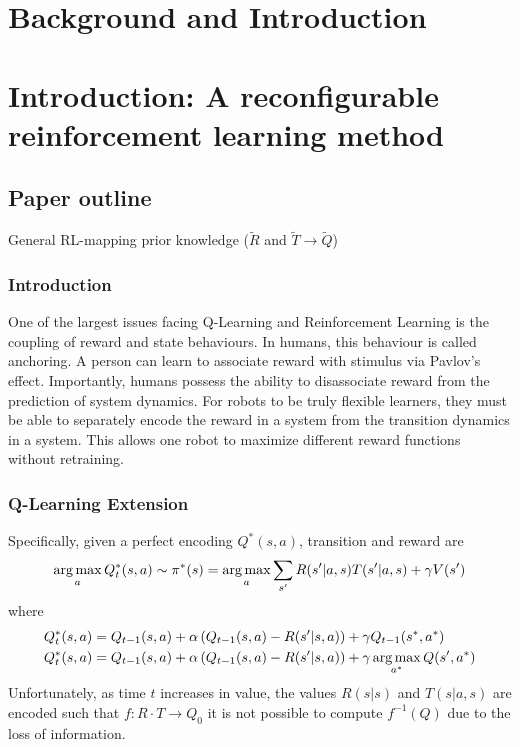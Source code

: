 \section{Background and Introduction}
\label{sec:intro}  

\section*{Introduction: A reconfigurable reinforcement learning method}

\subsection{Paper outline} \circled{$\alpha$} General RL-mapping prior knowledge ($\tilde{R}$ and $\tilde{T}\to\tilde{Q}$)\\

\subsubsection{Introduction} 

One of the largest issues facing Q-Learning and Reinforcement Learning is the coupling of reward and state behaviours. In humans, this behaviour is called anchoring. A person can learn to associate reward with stimulus via Pavlov's effect. Importantly, humans possess the ability to disassociate reward from the prediction of system dynamics. For robots to be truly flexible learners, they must be able to separately encode the reward in a system from the transition dynamics in a system.  This allows one robot to maximize different reward functions without retraining.

\subsubsection{Q-Learning Extension}

Specifically, given a perfect encoding $Q^\ast(s, a)$, transition and reward are 
\begin{equation}
\operatorname*{arg\,max}_{a} Q_t^\ast(s,a)\sim\pi^\ast(s) = \operatorname*{arg\,max}_{a} \sum_{s^\prime} R( s^\prime | a, s ) T( s^\prime | a, s ) + \gamma V( s^\prime )
\end{equation}
where
\begin{align}
Q^\ast_t(s,a) & = Q_{t-1}(s,a)+\alpha \left( Q_{t-1}( s, a ) - R( s^\prime | s, a ) \right) + \gamma Q_{t-1} ( s^\ast, a^\ast ) \\
Q^\ast_t(s,a) & = Q_{t-1}(s,a)+\alpha \left( Q_{t-1}( s, a ) - R( s^\prime | s, a ) \right) + \gamma \operatorname*{arg\,max}_{a^\ast} Q ( s^\prime, a^\ast )
\end{align}
Unfortunately, as time $t$ increases in value, the values $R(s|s)$ and $T(s|a,s)$ are encoded such that $f:R\cdot T\to Q_0$ it is not possible to compute $f^{-1}(Q)$ due to the loss of information. 

